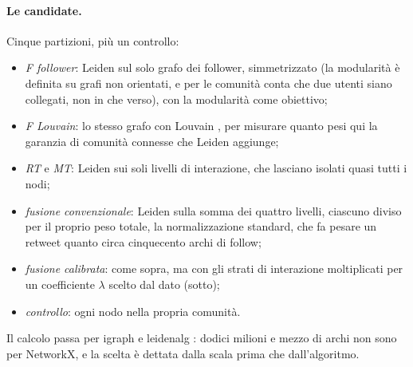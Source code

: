 \documentclass[11pt,a4paper]{article}
\begin{document}
\paragraph{Le candidate.} Cinque partizioni, più un controllo:
\begin{itemize}
  \item \emph{F follower}: Leiden \citep{traag2019} sul solo grafo dei follower, simmetrizzato (la modularità è definita su grafi non orientati, e per le comunità conta che due utenti siano collegati, non in che verso), con la modularità come obiettivo;
  \item \emph{F Louvain}: lo stesso grafo con Louvain \citep{blondel2008}, per misurare quanto pesi qui la garanzia di comunità connesse che Leiden aggiunge;
  \item \emph{RT} e \emph{MT}: Leiden sui soli livelli di interazione, che lasciano isolati quasi tutti i nodi;
  \item \emph{fusione convenzionale}: Leiden sulla somma dei quattro livelli, ciascuno diviso per il proprio peso totale, la normalizzazione standard, che fa pesare un retweet quanto circa cinquecento archi di follow;
  \item \emph{fusione calibrata}: come sopra, ma con gli strati di interazione moltiplicati per un coefficiente $\lambda$ scelto dal dato (sotto);
  \item \emph{controllo}: ogni nodo nella propria comunità.
\end{itemize}
Il calcolo passa per igraph \citep{csardi2006} e leidenalg \citep{traag2019}: dodici milioni e mezzo di archi non sono per NetworkX, e la scelta è dettata dalla scala prima che dall'algoritmo.
\end{document}
